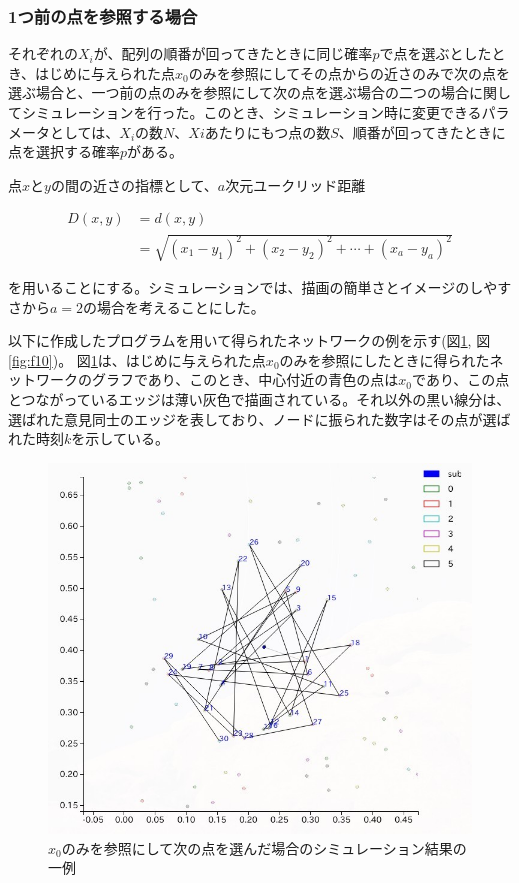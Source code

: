 \subsubsection{1つ前の点を参照する場合}

それぞれの$X_{i}$が、配列の順番が回ってきたときに同じ確率$p$で点を選ぶとしたとき、はじめに与えられた点$x_{0}$のみを参照にしてその点からの近さのみで次の点を選ぶ場合と、一つ前の点のみを参照にして次の点を選ぶ場合の二つの場合に関してシミュレーションを行った。このとき、シミュレーション時に変更できるパラメータとしては、$X_{i}$の数$N$、$X{i}$あたりにもつ点の数$S$、順番が回ってきたときに点を選択する確率$p$がある。

点$x$と$y$の間の近さの指標として、$a$次元ユークリッド距離

\begin{align}D(x, y) &= d(x,y)\\
&= \sqrt{(x_{1} - y_{1})^{2} + (x_{2} - y_{2})^{2} + \cdots + (x_{a} - y_{a})^{2}}\end{align}

を用いることにする。シミュレーションでは、描画の簡単さとイメージのしやすさから$a=2$の場合を考えることにした。

以下に作成したプログラムを用いて得られたネットワークの例を示す(図\ref{fig:f9}, 図\ref{fig:f10})。
図\ref{fig:f9}は、はじめに与えられた点$x_{0}$のみを参照にしたときに得られたネットワークのグラフであり、このとき、中心付近の青色の点は$x_{0}$であり、この点とつながっているエッジは薄い灰色で描画されている。それ以外の黒い線分は、選ばれた意見同士のエッジを表しており、ノードに振られた数字はその点が選ばれた時刻$k$を示している。

\begin{figure}[H]
    \begin{center}
        \includegraphics[width=12.5cm]{../simple3/case_2.jpg}
        \caption{$x_{0}$のみを参照にして次の点を選んだ場合のシミュレーション結果の一例}
        \label{fig:f9}
    \end{center}
\end{figure}

